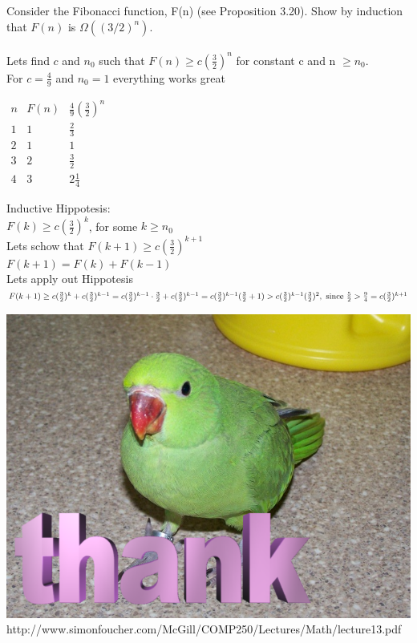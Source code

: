 \documentclass{article}
\begin{document}
Consider the Fibonacci function, F(n) (see Proposition 3.20). Show by
induction that $F(n)$ is $\Omega((3/2)^n)$.\\\\

Lets find $c$ and $n_{0}$ such that $F(n) \geq c(\frac{3}{2})^{n}$ for constant c and n $\geq n_0$.\\
For $c = \frac{4}{9}$ and $n_{0} = 1$ everything works great\\
\begin{center}
	$
	\begin{array}{ccc}
	n	& F(n) & \frac{4}{9} (\frac{3}{2})^n \\ 
	1	& 1 & \frac{2}{3} \\ 
	2	& 1 & 1 \\ 
	3	& 2 & \frac{3}{2} \\
	4	& 3 & 2\frac{1}{4}
	\end{array} 
	$
\end{center}
Inductive Hippotesis:\\
$F(k) \geq c(\frac{3}{2})^{k}$, for some $k \geq n_0$\\
Lets schow that $F(k+1) \geq c(\frac{3}{2})^{k+1}$\\

$F(k+1) = F(k) + F(k-1)$\\
Lets apply out Hippotesis\\
\begin{math}
F(k+1) \geq c(\frac{3}{2})^{k} + c(\frac{3}{2})^{k-1}\\
= c(\frac{3}{2})^{k-1}\cdot\frac{3}{2} + c(\frac{3}{2})^{k-1}\\
= c(\frac{3}{2})^{k-1}(\frac{3}{2}+1)\\
> c(\frac{3}{2})^{k-1}(\frac{3}{2})^{2}, \textnormal{ since } \frac{5}{2} > \frac{9}{4} \\
= c(\frac{3}{2})^{k+1}
\end{math}

\begin{center}
	\includegraphics[scale=0.3]{birb}
	http://www.simonfoucher.com/McGill/COMP250/Lectures/Math/lecture13.pdf
\end{center}

	
\end{document}
